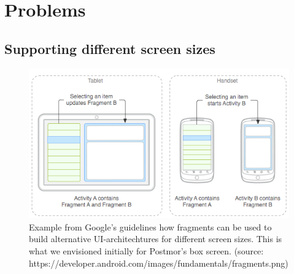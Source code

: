 \documentclass[acmlarge, review=false, screen=true]{acmart}
\begin{document}
  \section{Problems}

    \subsection{Supporting different screen sizes}
      \begin{figure}
        \includegraphics[width=\textwidth]{images/FRAGMENTS.png}
        \caption{Example from Google's guidelines how fragments can be used to build alternative UI-architechtures for different screen sizes. This is what we envisioned initially for Postmor's box screen. (source: https://developer.android.com/images/fundamentals/fragments.png)}
        \label{fig:tablet-view}
      \end{figure}
\end{document}
